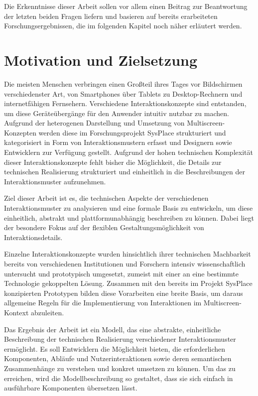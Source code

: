 Die Erkenntnisse dieser Arbeit sollen vor allem einen Beitrag zur Beantwortung der letzten beiden Fragen liefern und basieren auf bereits erarbeiteten Forschungsergebnissen, die im folgenden Kapitel noch näher erläutert werden.

\section{Motivation und Zielsetzung}
Die meisten Menschen verbringen einen Großteil ihres Tages vor Bildschirmen verschiedenster Art, von Smartphones über Tablets zu Desktop-Rechnern und internetfähigen Fernsehern. Verschiedene Interaktionskonzepte sind entstanden, um diese Geräteübergänge für den Anwender intuitiv nutzbar zu machen. Aufgrund der heterogenen Darstellung und Umsetzung von Multiscreen-Konzepten werden diese im Forschungsprojekt SysPlace strukturiert und kategorisiert in Form von Interaktionsmustern erfasst und Designern sowie Entwicklern zur Verfügung gestellt. Aufgrund der hohen technischen Komplexität dieser Interaktionskonzepte fehlt bisher die Möglichkeit, die Details zur technischen Realisierung strukturiert und einheitlich in die Beschreibungen der Interaktionsmuster aufzunehmen.

Ziel dieser Arbeit ist es, die technischen Aspekte der verschiedenen Interaktionsmuster zu analysieren und eine formale Basis zu entwickeln, um diese einheitlich, abstrakt und plattformunabhängig beschreiben zu können. Dabei liegt der besondere Fokus auf der flexiblen Gestaltungsmöglichkeit von Interaktionsdetails.

Einzelne Interaktionskonzepte wurden hinsichtlich ihrer technischen Machbarkeit bereits von verschiedenen Institutionen und Forschern intensiv wissenschaftlich untersucht und prototypisch umgesetzt, zumeist mit einer an eine bestimmte Technologie gekoppelten Lösung. Zusammen mit den bereits im Projekt SysPlace konzipierten Prototypen bilden diese Vorarbeiten eine breite Basis, um daraus allgemeine Regeln für die Implementierung von Interaktionen im Multiscreen-Kontext abzuleiten.

Das Ergebnis der Arbeit ist ein Modell, das eine abstrakte, einheitliche Beschreibung der technischen Realisierung verschiedener Interaktionsmuster ermöglicht. Es soll Entwicklern die Möglichkeit bieten, die erforderlichen Komponenten, Abläufe und Nutzerinteraktionen sowie deren semantischen Zusammenhänge zu verstehen und konkret umsetzen zu können. Um das zu erreichen, wird die Modellbeschreibung so gestaltet, dass sie sich einfach in ausführbare Komponenten übersetzen lässt. 

